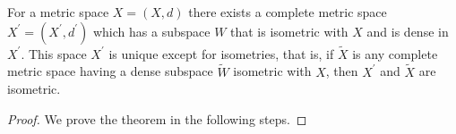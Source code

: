 
\begin{solution}
    \begin{thm}

        For a metric space $X = (X, d)$ there
        exists a complete metric space $X^\prime
        =(X^\prime, d^\prime)$
        which has a subspace $W$ that is
        isometric with $X$ and is dense in $X^\prime$.
        This space $X^\prime$ is unique except for
        isometries, that is, if $\tilde{X}$ is
        any complete metric space having a dense
        subspace $\tilde{W}$ isometric with $X$,
        then $X^\prime$ and
        $\tilde{X}$ are isometric.
    \end{thm}
    
    \begin{proof}
        We prove the theorem in the following steps.
        

\end{proof}
\end{solution}
